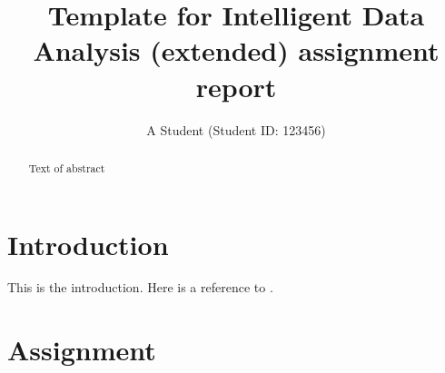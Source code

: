 \documentclass[preprint,12pt]{elsarticle}
\begin{document}
\begin{frontmatter}



\title{Template for Intelligent Data Analysis (extended) assignment report}


\author{A Student (Student ID: 123456)}

\address{School of Computer Science, University of Birmingham}

\begin{abstract}
Text of abstract

\end{abstract}

\begin{keyword}


\end{keyword}

\end{frontmatter}


\section{Introduction}
\label{s:introduction}
This is the introduction.  Here is a reference to \cite{baber2017}.
\section{Assignment}
\label{s:assignment}
%
\end{document}
